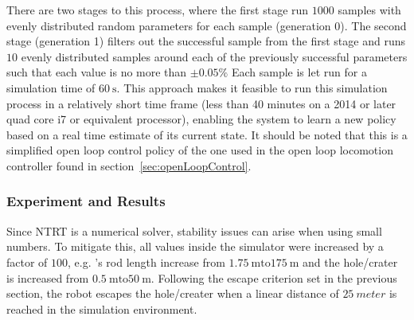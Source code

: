 There are two stages to this process, where the first stage run \(1000\) samples with evenly distributed random parameters for each sample (generation 0).
The second stage (generation 1) filters out the successful sample from the first stage and runs \(10\) evenly distributed samples around each of the previously successful parameters such that each value is no more than \(\pm 0.05\%\)
Each sample is let run for a simulation time of \(\SI{60}{\second}\).
This approach makes it feasible to run this simulation process in a relatively short time frame (less than 40 minutes on a 2014 or later quad core i7 or equivalent processor), enabling the system to learn a new policy based on a real time estimate of its current state.
It should be noted that this is a simplified open loop control policy of the one used in the open loop locomotion controller found in section~\ref{sec:openLoopControl}.

\subsubsection{Experiment and Results}
Since NTRT is a numerical solver, stability issues can arise when using small numbers.
To mitigate this, all values inside the simulator were increased by a factor of \(100\), e.g. \SB{}'s rod length increase from \(\SI{1.75}{\meter} \text{to} \SI{175}{\meter}\) and the hole/crater is increased from \(\SI{0.5}{\meter} \text{to} \SI{50}{\meter}\).
Following the escape criterion set in the previous section, the robot escapes the hole/creater when a linear distance of \(\SI{25}{meter}\) is reached in the simulation environment.

